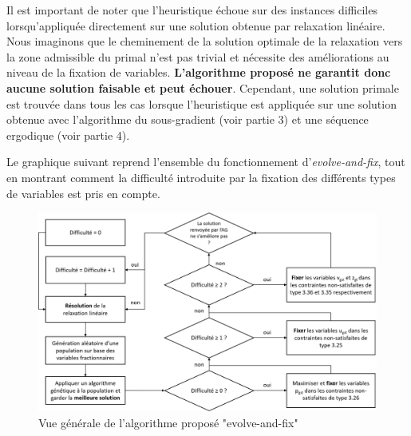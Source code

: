 Il est important de noter que l'heuristique échoue sur des instances difficiles lorsqu'appliquée
directement sur une solution obtenue par relaxation linéaire. Nous imaginons que le cheminement
de la solution optimale de la relaxation vers la zone admissible du primal n'est pas trivial
et nécessite des améliorations au niveau de la fixation de variables.
\textbf{L'algorithme proposé ne garantit donc aucune solution faisable et peut échouer}.
Cependant, une solution primale est trouvée dans tous les cas lorsque l'heuristique
est appliquée sur une solution obtenue avec l'algorithme du sous-gradient (voir partie 3) et une
séquence ergodique (voir partie 4).

Le graphique suivant reprend l'ensemble du fonctionnement d'\textit{evolve-and-fix}, tout en montrant comment
la difficulté introduite par la fixation des différents types de variables est pris en compte.

\begin{figure}[h!]
    \begin{center}
        \includegraphics[width=\textwidth]{imgs/evolveandfix.png}\\
        Vue générale de l'algorithme proposé "evolve-and-fix"
    \end{center}
\end{figure}
